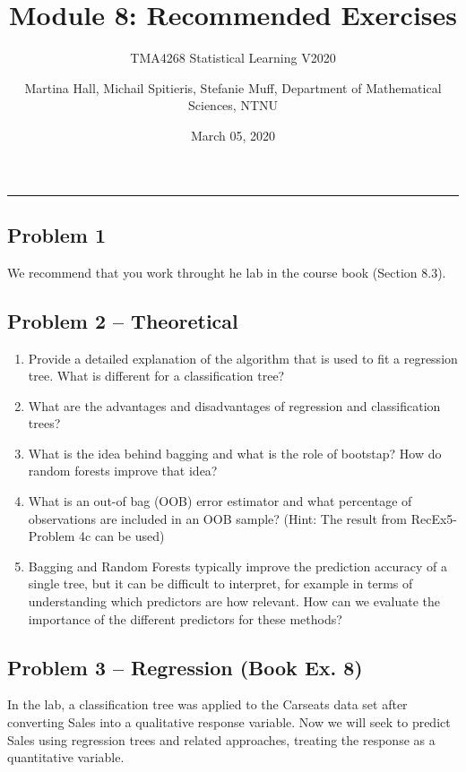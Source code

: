 \documentclass[]{article}
\title{Module 8: Recommended Exercises}
\subtitle{TMA4268 Statistical Learning V2020}
\author{Martina Hall, Michail Spitieris, Stefanie Muff, Department of
Mathematical Sciences, NTNU}
\date{March 05, 2020}
\begin{document}
\maketitle

\begin{center}\rule{0.5\linewidth}{0.5pt}\end{center}

\subsection{Problem 1}\label{problem-1}

We recommend that you work throught he lab in the course book (Section
8.3).

\subsection{Problem 2 -- Theoretical}\label{problem-2-theoretical}

\begin{enumerate}
\def\labelenumi{\alph{enumi})}
\item
  Provide a detailed explanation of the algorithm that is used to fit a
  regression tree. What is different for a classification tree?
\item
  What are the advantages and disadvantages of regression and
  classification trees?
\item
  What is the idea behind bagging and what is the role of bootstap? How
  do random forests improve that idea?
\item
  What is an out-of bag (OOB) error estimator and what percentage of
  observations are included in an OOB sample? (Hint: The result from
  RecEx5-Problem 4c can be used)
\item
  Bagging and Random Forests typically improve the prediction accuracy
  of a single tree, but it can be difficult to interpret, for example in
  terms of understanding which predictors are how relevant. How can we
  evaluate the importance of the different predictors for these methods?
\end{enumerate}

\subsection{Problem 3 -- Regression (Book Ex.
8)}\label{problem-3-regression-book-ex.-8}

In the lab, a classification tree was applied to the Carseats data set
after converting Sales into a qualitative response variable. Now we will
seek to predict Sales using regression trees and related approaches,
treating the response as a quantitative variable.
\end{document}
